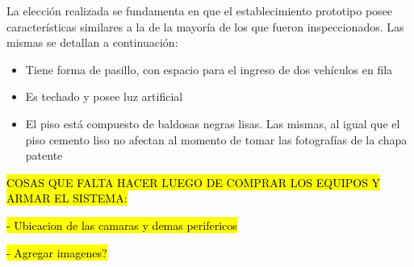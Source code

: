 La elección realizada se fundamenta en que el establecimiento prototipo posee características similares a la de la mayoría de los que fueron inspeccionados. Las mismas se detallan a continuación:
\begin{itemize}
	\item Tiene forma de pasillo, con espacio para el ingreso de dos vehículos en fila
	\item Es techado y posee luz artificial
	\item El piso está compuesto de baldosas negras lisas. Las mismas, al igual que el piso cemento liso no afectan al momento de tomar las fotografías de la chapa patente
\end{itemize}

\hl{COSAS QUE FALTA HACER LUEGO DE COMPRAR LOS EQUIPOS Y ARMAR EL SISTEMA:}

\hl{-	Ubicacion de las camaras y demas perifericos}

\hl{-	Agregar imagenes?}



